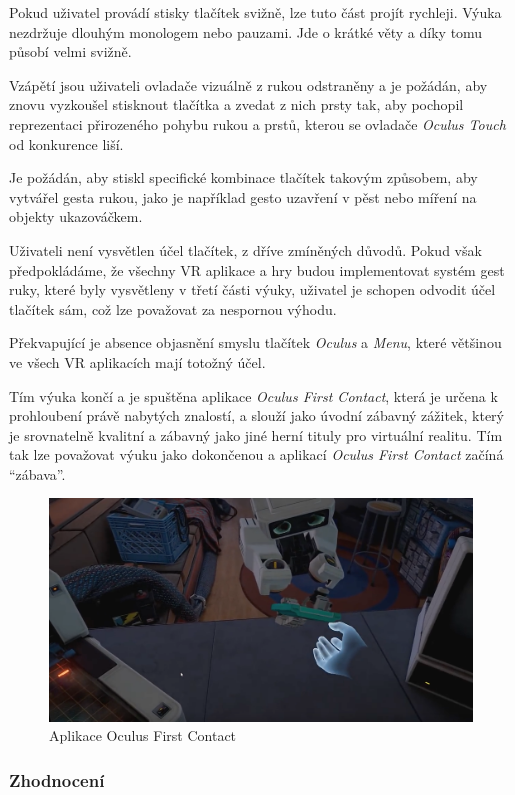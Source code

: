 Pokud uživatel provádí stisky tlačítek svižně, lze tuto část projít
rychleji. Výuka nezdržuje dlouhým monologem nebo pauzami. Jde o krátké
věty a díky tomu působí velmi svižně.

Vzápětí jsou uživateli ovladače vizuálně z rukou odstraněny a je
požádán, aby znovu vyzkoušel stisknout tlačítka a zvedat z nich prsty
tak, aby pochopil reprezentaci přirozeného pohybu rukou a prstů, kterou
se ovladače \emph{Oculus Touch} od konkurence liší. 

Je požádán, aby
stiskl specifické kombinace tlačítek takovým způsobem, aby vytvářel
gesta rukou, jako je například gesto uzavření v pěst nebo míření na
objekty ukazováčkem.

Uživateli není vysvětlen účel tlačítek, z dříve zmíněných důvodů. Pokud
však předpokládáme, že všechny VR aplikace a hry budou implementovat
systém gest ruky, které byly vysvětleny v třetí části výuky, uživatel je
schopen odvodit účel tlačítek sám, což lze považovat za nespornou
výhodu.

Překvapující je absence objasnění smyslu tlačítek \emph{Oculus} a
\emph{Menu}, které většinou ve všech VR aplikacích mají totožný účel.

Tím výuka končí a je spuštěna aplikace \emph{Oculus First Contact},
která je určena k prohloubení právě nabytých znalostí, a slouží jako
úvodní zábavný zážitek, který je srovnatelně kvalitní a zábavný jako
jiné herní tituly pro virtuální realitu. Tím tak lze považovat výuku
jako dokončenou a aplikací \emph{Oculus First Contact} začíná
``zábava''.

\begin{figure}[h!]
\centering
\includegraphics[width=12cm]{src/assets/oculus-first-contact.png}
\caption{Aplikace Oculus First Contact}
\end{figure}

\subsubsection{Zhodnocení}\label{zhodnocenuxed-1}

